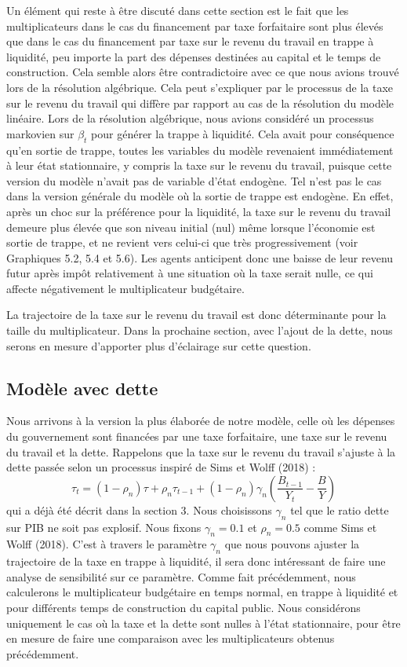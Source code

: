\documentclass[12pt,letterpaper]{article}
\begin{document}
Un élément qui reste à être discuté dans cette section est le fait que les multiplicateurs dans le cas du financement par taxe forfaitaire sont plus élevés que dans le cas du financement par taxe sur le revenu du travail en trappe à liquidité, peu importe la part des dépenses destinées au capital et le temps de construction. Cela semble alors être contradictoire avec ce que nous avions trouvé lors de la résolution algébrique. Cela peut s’expliquer par le processus de la taxe sur le revenu du travail qui diffère par rapport au cas de la résolution du modèle linéaire. Lors de la résolution algébrique, nous avions considéré un processus markovien sur $\beta_t$ pour générer la trappe à liquidité. Cela avait pour conséquence qu’en sortie de trappe, toutes les variables du modèle revenaient immédiatement à leur état stationnaire, y compris la taxe sur le revenu du travail, puisque cette version du modèle n’avait pas de variable d’état endogène. Tel n’est pas le cas dans la version générale du modèle où la sortie de trappe est endogène. En effet, après un choc sur la préférence pour la liquidité, la taxe sur le revenu du travail demeure plus élevée que son niveau initial (nul) même lorsque l’économie est sortie de trappe, et ne revient vers celui-ci que très progressivement (voir Graphiques 5.2, 5.4 et 5.6). Les agents anticipent donc une baisse de leur revenu futur après impôt relativement à une situation où la taxe serait nulle, ce qui affecte négativement le multiplicateur budgétaire.

La trajectoire de la taxe sur le revenu du travail est donc déterminante pour la taille du multiplicateur. Dans la prochaine section, avec l’ajout de la dette, nous serons en mesure d’apporter plus d’éclairage sur cette question.

\subsection{Modèle avec dette}

Nous arrivons à la version la plus élaborée de notre modèle, celle où les dépenses du gouvernement sont financées par une taxe forfaitaire, une taxe sur le revenu du travail et la dette. Rappelons que la taxe sur le revenu du travail s’ajuste à la dette passée selon un processus inspiré de Sims et Wolff (2018) :
\begin{equation*}
\tau_t = (1-\rho_n)\tau + \rho_n\tau_{t-1} + (1-\rho_n)\gamma_n\left(\frac{B_{t-1}}{Y_t} - \frac{B}{Y}\right)
\end{equation*}
qui a déjà été décrit dans la section 3. Nous choisissons $\gamma_n$ tel que le ratio dette sur PIB ne soit pas explosif. Nous fixons $\gamma_n = 0.1$ et $\rho_n = 0.5$ comme Sims et Wolff (2018). C’est à travers le paramètre $\gamma_n$ que nous pouvons ajuster la trajectoire de la taxe en trappe à liquidité, il sera donc intéressant de faire une analyse de sensibilité sur ce paramètre. Comme fait précédemment, nous calculerons le multiplicateur budgétaire en temps normal, en trappe à liquidité et pour différents temps de construction du capital public. Nous considérons uniquement le cas où la taxe et la dette sont nulles à l’état stationnaire, pour être en mesure de faire une comparaison avec les multiplicateurs obtenus précédemment.
\end{document}
